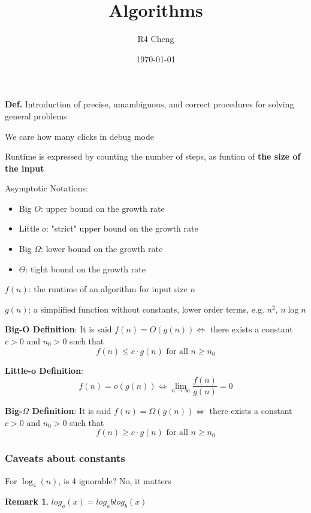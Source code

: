 \documentclass[12pt,a4paper]{article}
\title{Algorithms}
\author{R4 Cheng}
\date{\today}
\newtheorem*{rem}{Remark}
\newcommand{\Remark}[1]{
  \begin{rem}
    \color{cyan}
    #1
  \end{rem}
}
\begin{document}
\maketitle

\textbf{Def.} Introduction of precise, umambiguous, and correct procedures for solving general problems

We care how many clicks in debug mode

Runtime is expressed by counting the number of steps, as funtion of \textbf{the size of the input}

Asymptotic Notations:

\begin{itemize}
  \item Big $O$: upper bound on the growth rate
  \item Little $o$: "strict" upper bound on the growth rate
  \item Big $\Omega$: lower bound on the growth rate
  \item $\Theta$: tight bound on the growth rate
\end{itemize}

$f(n)$: the runtime of an algorithm for input size $n$

$g(n)$: a simplified function without constants, lower order terms, e.g. $n^2$, $n \log n$

\textbf{Big-O Definition}: It is said $f(n) = O(g(n)) \iff$ there exists a constant $c > 0$ and $n_0 > 0$ such that
$$f(n) \leq c \cdot g(n) \text{ for all } n \geq n_0$$

\textbf{Little-o Definition}:
$$f(n) = o(g(n)) \iff \lim_{n \to \infty} \frac{f(n)}{g(n)} = 0$$

\textbf{Big-$\Omega$ Definition}: It is said $f(n) = \Omega(g(n)) \iff$ there exists a constant $c > 0$ and $n_0 > 0$ such that
$$f(n) \geq c \cdot g(n) \text{ for all } n \geq n_0$$

\subsubsection*{Caveats about constants}

For $\log_4(n)$, is 4 ignorable? No, it matters

\Remark{$log_a(x) = log_a blog_b(x)$}
\end{document}
